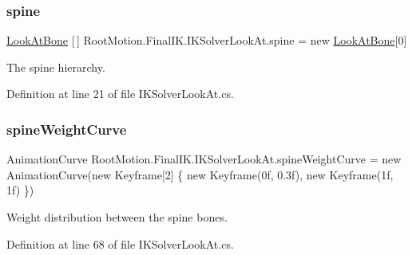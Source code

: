 \mbox{\label{class_root_motion_1_1_final_i_k_1_1_i_k_solver_look_at_a856ceade46766c164526b7d3d23e010e}} 
\subsubsection{\texorpdfstring{spine}{spine}}
{\footnotesize\ttfamily \mbox{\hyperlink{class_root_motion_1_1_final_i_k_1_1_i_k_solver_look_at_1_1_look_at_bone}{Look\+At\+Bone}} \mbox{[}$\,$\mbox{]} Root\+Motion.\+Final\+I\+K.\+I\+K\+Solver\+Look\+At.\+spine = new \mbox{\hyperlink{class_root_motion_1_1_final_i_k_1_1_i_k_solver_look_at_1_1_look_at_bone}{Look\+At\+Bone}}\mbox{[}0\mbox{]}}



The spine hierarchy. 



Definition at line 21 of file I\+K\+Solver\+Look\+At.\+cs.

\mbox{\label{class_root_motion_1_1_final_i_k_1_1_i_k_solver_look_at_a971a286cc06a406e4119f36c988090ca}} 
\subsubsection{\texorpdfstring{spine\+Weight\+Curve}{spineWeightCurve}}
{\footnotesize\ttfamily Animation\+Curve Root\+Motion.\+Final\+I\+K.\+I\+K\+Solver\+Look\+At.\+spine\+Weight\+Curve = new Animation\+Curve(new Keyframe\mbox{[}2\mbox{]} \{ new Keyframe(0f, 0.\+3f), new Keyframe(1f, 1f) \})}



Weight distribution between the spine bones. 



Definition at line 68 of file I\+K\+Solver\+Look\+At.\+cs.

